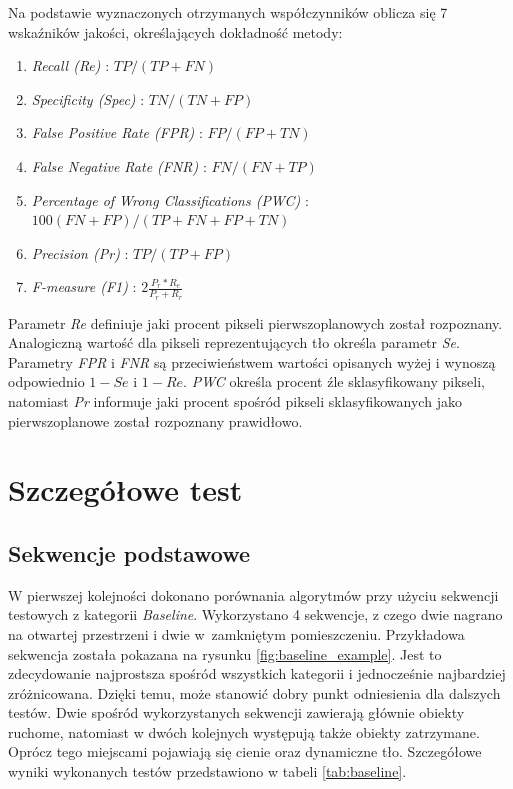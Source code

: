 \noindent Na podstawie wyznaczonych otrzymanych współczynników oblicza się 7 wskaźników jakości, określających dokładność metody:
%
\begin{enumerate}[nolistsep]
	\item \textit{Recall (Re)} : \tab \small{$TP/(TP+FN)$}
	\item \textit{Specificity (Spec)} : \tab \small{$TN/(TN+FP)$}
	\item \textit{False Positive Rate (FPR)} : \tab \small{$FP/(FP + TN)$}
	\item \textit{False Negative Rate (FNR)} : \tab \small{$FN/(FN + TP)$}
	\item \textit{Percentage of Wrong Classifications (PWC)} : \tab \small{$100(FN + FP)/(TP + FN + FP + TN)$}
	\item \textit{Precision (Pr)} : \tab \small{$TP/(TP + FP)$}
	\item \textit{F-measure (F1)} : \tab \small{$2\frac{P_r*R_e}{P_r+R_r}$}\\
\end{enumerate}

Parametr \textit{Re} definiuje jaki procent pikseli pierwszoplanowych został rozpoznany. Analogiczną wartość dla pikseli reprezentujących tło określa parametr \textit{Se}. Parametry \textit{FPR} i \textit{FNR} są przeciwieństwem wartości opisanych wyżej i wynoszą odpowiednio $1-Se$ i $1-Re$. \textit{PWC} określa procent źle sklasyfikowany pikseli, natomiast \textit{Pr} informuje jaki procent spośród pikseli sklasyfikowanych jako pierwszoplanowe został rozpoznany prawidłowo.

\section{Szczegółowe test}
\label{sec:testy}

\subsection{Sekwencje podstawowe}
\label{subsec:sewkencje_podstawowe}

W pierwszej kolejności dokonano porównania algorytmów przy użyciu sekwencji testowych z kategorii \textit{Baseline}. Wykorzystano 4 sekwencje, z czego dwie nagrano na otwartej przestrzeni i dwie w~zamkniętym pomieszczeniu. Przykładowa sekwencja została pokazana na rysunku \ref{fig:baseline_example}. Jest to zdecydowanie najprostsza spośród wszystkich kategorii i jednocześnie najbardziej zróżnicowana. Dzięki temu, może stanowić dobry punkt odniesienia dla dalszych testów. Dwie spośród wykorzystanych sekwencji zawierają głównie obiekty ruchome, natomiast w dwóch kolejnych występują także obiekty zatrzymane. Oprócz tego miejscami pojawiają się cienie oraz dynamiczne tło. Szczegółowe wyniki wykonanych testów przedstawiono w tabeli \ref{tab:baseline}.

